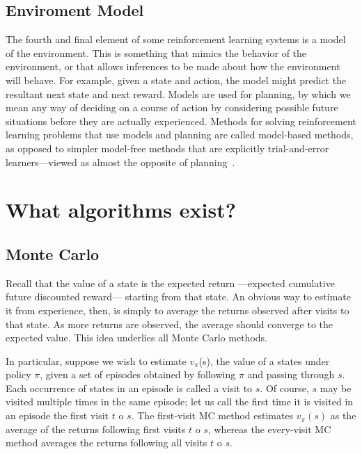 \documentclass[letterpaper, 10 pt]{IEEEconf}
\begin{document}
\subsection{Enviroment Model}

The fourth and final element of some reinforcement learning systems is
a model of the environment. This is something that mimics the behavior
of the environment, or that allows inferences to be made about how the
environment will behave. For example, given a state and action, the
model might predict the resultant next state and next reward. Models
are used for planning, by which we mean any way of deciding on a
course of action by considering possible future situations before they
are actually experienced. Methods for solving reinforcement learning
problems that use models and planning are called model-based methods,
as opposed to simpler model-free methods that are explicitly
trial-and-error learners—viewed as almost the opposite of planning~\cite{sutton2018reinforcement}.

\section{What algorithms exist?}

\todo{}

\subsection{Monte Carlo}

Recall that the value of a state is the expected return —expected cumulative future discounted reward— starting from that state. An obvious way to estimate it from experience, then, is simply to average the returns observed after visits to that state. As more returns are observed, the average should converge to the expected value. This idea underlies all Monte Carlo methods.

In particular, suppose we wish to estimate $v_\pi$(s), the value of a
states under policy $\pi$, given a set of episodes obtained by
following $\pi$ and passing through $s$. Each occurrence of states in an
episode is called a visit to $s$. Of course, $s$ may be visited multiple
times in the same episode; let us call the first time it is visited in
an episode the first visit $t$ o $s$. The first-visit MC method estimates
$v_\pi(s)$ as the average of the returns following first visits $t$ o $s$,
whereas the every-visit MC method averages the returns following all
visits $t$ o $s$.
\end{document}
